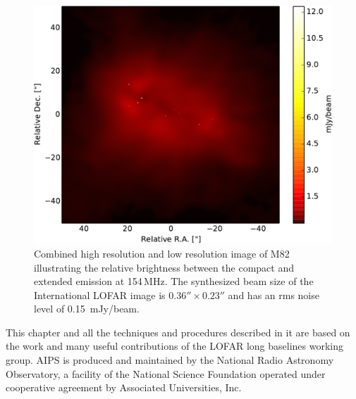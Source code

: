 \documentclass[graybox]{svmult}
\begin{document}
\begin{figure}
\begin{center}
\includegraphics[width=\textwidth]{figures/M82HIGH_FEATHER-crop.pdf}
\caption{Combined high resolution and low resolution image of M82 illustrating
the relative brightness between the compact and extended emission at 154\,MHz.
The synthesized beam size of the International LOFAR image is
$0.36''\times0.23''$ and has an rms noise level of 0.15~mJy/beam.}
\label{fig:final}
\end{center}
\end{figure}







\begin{acknowledgement}
This chapter and all the techniques and procedures described in it are based on
the work and many useful contributions of the LOFAR long baselines working
group. AIPS is produced and maintained by the National Radio Astronomy
Observatory, a facility of the National Science Foundation operated under
cooperative agreement by Associated Universities, Inc.

\end{acknowledgement}

%



\end{document}
